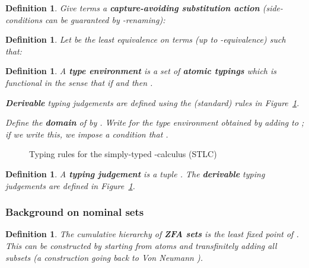 \documentclass[submission,copyright]{eptcs}
\newtheorem{defn}[thrm]{Definition}
\newcommand{\deffont}[1]{\textbf{#1}}
\begin{document}
\begin{defn}
\label{defn.sub}
Give terms a \deffont{capture-avoiding substitution action}  (side-conditions can be guaranteed by -renaming):

\end{defn}




\begin{defn}
\label{defn.congruence}
\label{defn.beta.equivalence}
Let  be the least equivalence on terms (up to -equivalence) such that: 

\end{defn}




\begin{defn}
\label{defn.st.environments}
A \deffont{type environment}  is a set of \deffont{atomic typings}  which is \emph{functional} in the sense that if  and  then .

\deffont{Derivable} typing judgements  are defined using the (standard) rules in Figure~\ref{fig.typing.rules}.

Define the \deffont{domain} of  by .
Write  for the type environment obtained by adding  to ; if we write this, we impose a condition that . 
\end{defn}



\begin{figure}

\caption{Typing rules for the simply-typed -calculus (STLC)}
\label{fig.typing.rules}
\end{figure}

\begin{defn}
\label{defn.typing.rules}
A \deffont{typing judgement} is a tuple .
The \deffont{derivable} typing judgements are defined in Figure~\ref{fig.typing.rules}.
\end{defn}









\subsubsection*{Background on nominal sets}





\begin{defn}
\label{defn.U}
The cumulative hierarchy of \deffont{ZFA sets}  is the least fixed point of .
This can be constructed by starting from atoms and transfinitely adding all subsets (a construction going back to Von Neumann \cite{vonneumann:ubewam}).
\end{defn}
\end{document}
